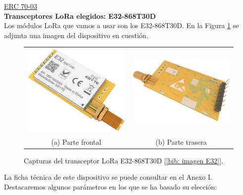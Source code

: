 \documentclass[12pt]{article}
\begin{document}
	\noindent \href{https://docdb.cept.org/download/25c41779-cd6e/Rec7003e.pdf}{ERC 70-03} \\

	\noindent \textbf{Transceptores LoRa elegidos: E32-868T30D} \\
	
	\noindent Los módulos LoRa que vamos a usar son los E32-868T30D. En la Figura \ref{fig: capturas E32.} se adjunta una imagen del dispositivo en cuestión. \\
	
	\begin{figure}[h]
		\begin{center}
			\begin{tabular}{cc}
				\includegraphics[width=60mm]{img/e32_front.png} &   \includegraphics[width=60mm]{img/e32_rear.png} \\
				(a) Parte frontal & (b) Parte trasera\\[6pt]
			\end{tabular}
			\caption{Capturas del transceptor LoRa E32-868T30D [\ref{bib: imagen E32}].}
			\label{fig: capturas E32.}
		\end{center}
	\end{figure}	
	
	\noindent La ficha técnica de este dispositivo se puede consultar en el Anexo I. Destacaremos algunos parámetros en los que se ha basado su elección: \\
	
\end{document}
